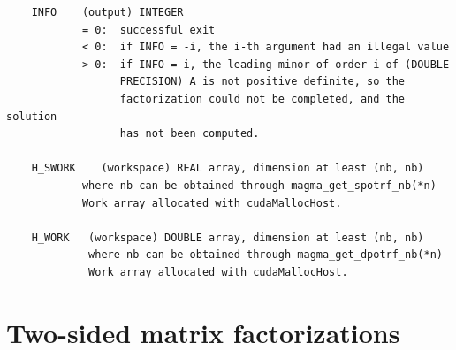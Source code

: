 \documentclass[10pt]{book}
\begin{document}
\begin{verbatim}
    INFO    (output) INTEGER
            = 0:  successful exit
            < 0:  if INFO = -i, the i-th argument had an illegal value
            > 0:  if INFO = i, the leading minor of order i of (DOUBLE
                  PRECISION) A is not positive definite, so the
                  factorization could not be completed, and the solution
                  has not been computed.

    H_SWORK    (workspace) REAL array, dimension at least (nb, nb)
            where nb can be obtained through magma_get_spotrf_nb(*n)
            Work array allocated with cudaMallocHost.

    H_WORK   (workspace) DOUBLE array, dimension at least (nb, nb)
             where nb can be obtained through magma_get_dpotrf_nb(*n)
             Work array allocated with cudaMallocHost.
\end{verbatim}


\newpage
\section{Two-sided matrix factorizations}

\newpage
\end{document}
